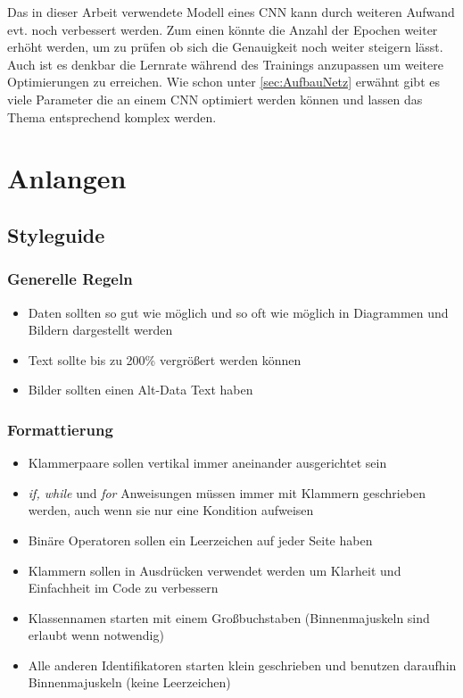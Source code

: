 \documentclass[11pt]{article}
\begin{document}
Das in dieser Arbeit verwendete Modell eines CNN kann durch weiteren Aufwand evt. noch verbessert werden. Zum einen könnte die Anzahl der Epochen weiter erhöht werden, um zu prüfen ob sich die Genauigkeit noch weiter steigern lässt. Auch ist es denkbar die Lernrate während des Trainings anzupassen um weitere Optimierungen zu erreichen. Wie schon unter \ref{sec:AufbauNetz} erwähnt gibt es viele Parameter die an einem CNN optimiert werden können und lassen das Thema entsprechend komplex werden. 

\pagebreak

\section{Anlangen}
\label{chap: Anlagen}
\subsection{Styleguide}
\subsubsection{Generelle Regeln}
\begin{itemize}
\item Daten sollten so gut wie möglich und so oft wie möglich in Diagrammen und Bildern dargestellt werden
\item Text sollte bis zu 200\% vergrößert werden können
\item Bilder sollten einen Alt-Data Text haben
\end{itemize}

\subsubsection{Formattierung}
\begin{itemize}
\item Klammerpaare sollen vertikal immer aneinander ausgerichtet sein
\item \textit{if, while} und \textit{for} Anweisungen müssen immer mit Klammern geschrieben werden, auch wenn sie nur eine Kondition aufweisen
\item Binäre Operatoren sollen ein Leerzeichen auf jeder Seite haben
\item Klammern sollen in Ausdrücken verwendet werden um Klarheit und Einfachheit im Code zu verbessern
\item Klassennamen starten mit einem Großbuchstaben (Binnenmajuskeln sind erlaubt wenn notwendig)
\item Alle anderen Identifikatoren starten klein geschrieben und benutzen daraufhin Binnenmajuskeln (keine Leerzeichen)
\end{itemize}
\end{document}
